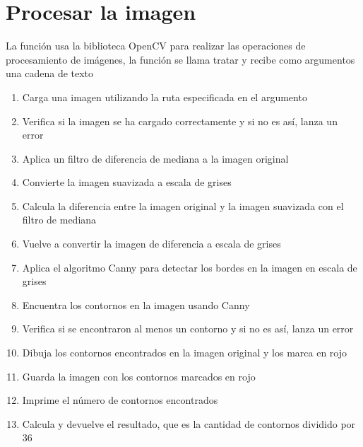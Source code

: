 \section{Procesar la imagen}
La función usa la biblioteca OpenCV para realizar las operaciones de procesamiento de imágenes, la función se llama tratar y recibe como argumentos una cadena de texto
\begin{enumerate}
    \item Carga una imagen utilizando la ruta especificada en el argumento 
    \item Verifica si la imagen se ha cargado correctamente y si no es así, lanza un error
    \item Aplica un filtro de diferencia de mediana a la imagen original
    \item Convierte la imagen suavizada a escala de grises
    \item Calcula la diferencia entre la imagen original y la imagen suavizada con el filtro de mediana
    \item Vuelve a convertir la imagen de diferencia a escala de grises
    \item Aplica el algoritmo Canny para detectar los bordes en la imagen en escala de grises
    \item Encuentra los contornos en la imagen usando Canny
    \item Verifica si se encontraron al menos un contorno y si no es así, lanza un error
    \item Dibuja los contornos encontrados en la imagen original y los marca en rojo
    \item Guarda la imagen con los contornos marcados en rojo
    \item Imprime el número de contornos encontrados 
    \item Calcula y devuelve el resultado, que es la cantidad de contornos dividido por 36
\end{enumerate}
\clearpage
\lstset{language=Python, breaklines=true, basicstyle=\footnotesize}
